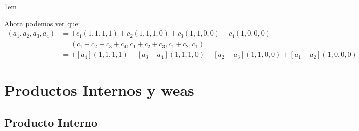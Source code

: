 \documentclass[12pt, fleqn]{report}                             %
\newenvironment{SmallIndentation}[1][0.75em]                    %
        {\begin{adjustwidth}{#1}{}\begin{footnotesize}}             %
        {\end{footnotesize}\end{adjustwidth}}                       %
\theoremstyle{break}                                            %
\begin{document}
\begin{itemize}
\begin{SmallIndentation}[1em]
                            Ahora podemos ver que:
                            \begin{align*}
                                (a_1, a_2, a_3, a_4)
                                    &= 
                                        + c_1 (1, 1, 1, 1)
                                        + c_2 (1, 1, 1, 0)
                                        + c_3 (1, 1, 0, 0)
                                        + c_4 (1, 0, 0, 0)                                  \\
                                    &= 
                                        (c_1+c_2+c_3+c_4, c_1+c_2+c_3, c_1+c_2, c_1)        \\
                                    &= 
                                        + [a_4]       (1, 1, 1, 1)
                                        + [a_3 - a_4] (1, 1, 1, 0)
                                        + [a_2 - a_3] (1, 1, 0, 0)
                                        + [a_1 - a_2] (1, 0, 0, 0)
                            \end{align*}

                        \end{SmallIndentation}

                \end{itemize}
          

\part{Productos Internos y weas}


    \chapter{Producto Interno}

        \clearpage
\end{document}
